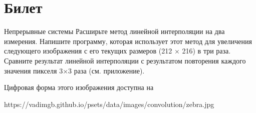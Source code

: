 \documentclass{exam}
\begin{document}
\section{Билет}
\begin{questions}
	\question 
Непрерывные системы 
	\question 
Расширьте метод линейной интерполяции на два измерения.  
Напишите программу, которая использует этот метод для 
увеличения следующего изображения с его текущих размеров 
(212 × 216) в три раза.  
Сравните результат линейной интерполяции с результатом 
повторения каждого значения пикселя 3×3 раза (см. приложение).


Цифровая форма этого изображения доступна 
на 

	https://vadimgb.github.io/psets/data/images/convolution/zebra.jpg
\end{questions}
\vspace{15pt}
\end{document}

